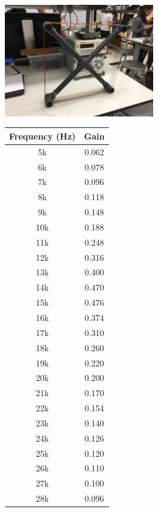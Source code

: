 \documentclass[journal]{IEEEtran}
\begin{document}
\begingroup
    \centering
    \includegraphics[width=245]{images/lab5_1.jpg}
    \label{fig:HPF}
\endgroup

\begingroup
    \medskip
    \centering
    \def\arraystretch{1.5}
    \begin{tabular}{cc}
    \hline
    Frequency (Hz) & Gain \\
    \hline
    5k & 0.062 \\
    6k & 0.078 \\
    7k & 0.096 \\
    8k & 0.118 \\
    9k & 0.148 \\
    10k & 0.188 \\
    11k & 0.248 \\
    12k & 0.316 \\
    13k & 0.400 \\
    14k & 0.470 \\
    15k & 0.476 \\
    16k & 0.374 \\
    17k & 0.310 \\
    18k & 0.260 \\
    19k & 0.220 \\
    20k & 0.200 \\
    21k & 0.170 \\
    22k & 0.154 \\
    23k & 0.140 \\
    24k & 0.126 \\
    25k & 0.120 \\
    26k & 0.110 \\
    27k & 0.100 \\
    28k & 0.096 \\

    \hline
    \end{tabular}
    \label{fig:tableLPF}
    \medskip
\endgroup
\end{document}
